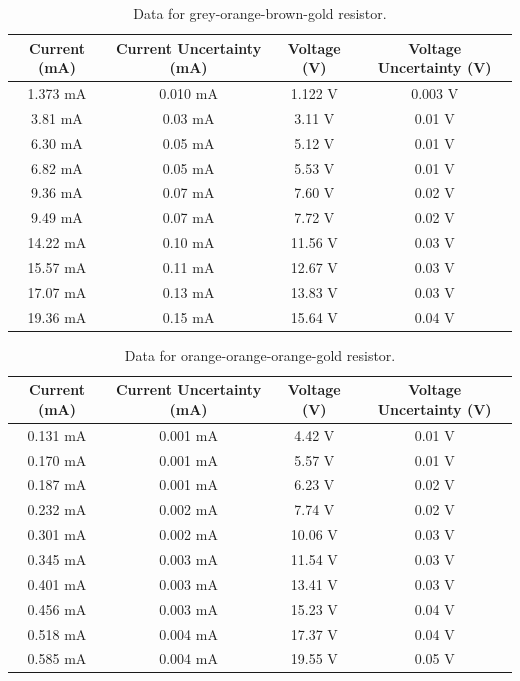 \documentclass[11pt]{article}
\begin{document}
\begin{table}[!htb]
    \caption{Data for grey-orange-brown-gold resistor.}
    \vspace{1em}\hline\hline\vspace{0.3em}\centering
    \begin{tabular}{cccc}
        Current (mA)&Current Uncertainty (mA)&Voltage (V)&Voltage Uncertainty (V)\\
        \hline
1.373 mA&0.010 mA&1.122 V&0.003 V\\
3.81 mA&0.03 mA&3.11 V&0.01 V\\
6.30 mA&0.05 mA&5.12 V&0.01 V\\
6.82 mA&0.05 mA&5.53 V&0.01 V\\
9.36 mA&0.07 mA&7.60 V&0.02 V\\
9.49 mA&0.07 mA&7.72 V&0.02 V\\
14.22 mA&0.10 mA&11.56 V&0.03 V\\
15.57 mA&0.11 mA&12.67 V&0.03 V\\
17.07 mA&0.13 mA&13.83 V&0.03 V\\
19.36 mA&0.15 mA&15.64 V&0.04 V\\

    \end{tabular}
    \hline\hline
\end{table}


\begin{table}[!htb]
    \caption{Data for orange-orange-orange-gold resistor.}
    \vspace{1em}\hline\hline\vspace{0.3em}\centering
    \begin{tabular}{cccc}
        Current (mA)&Current Uncertainty (mA)&Voltage (V)&Voltage Uncertainty (V)\\
        \hline
0.131 mA&0.001 mA&4.42 V&0.01 V\\
0.170 mA&0.001 mA&5.57 V&0.01 V\\
0.187 mA&0.001 mA&6.23 V&0.02 V\\
0.232 mA&0.002 mA&7.74 V&0.02 V\\
0.301 mA&0.002 mA&10.06 V&0.03 V\\
0.345 mA&0.003 mA&11.54 V&0.03 V\\
0.401 mA&0.003 mA&13.41 V&0.03 V\\
0.456 mA&0.003 mA&15.23 V&0.04 V\\
0.518 mA&0.004 mA&17.37 V&0.04 V\\
0.585 mA&0.004 mA&19.55 V&0.05 V\\

    \end{tabular}
    \hline\hline
\end{table}
\end{document}
